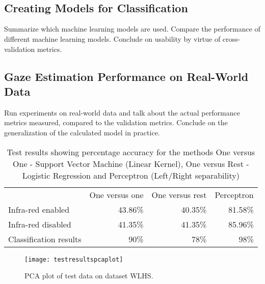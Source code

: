 \begin{minipage}{\linewidth}
{\begin{tabular}{ccccccc}
  \end{tabular}
  }
  \label{fig:wlhspcaimages}
  \end{minipage}\\\\



\subsection{Creating Models for Classification}
\label{sub:CreatingModelsforClassification}
Summarize which machine learning models are used.
Compare the performance of different machine learning models.
Conclude on usability by virtue of cross-validation metrics.
\subsection{Gaze Estimation Performance on Real-World Data}
\label{sub:GazeEstimationPerformanceonReal-WorldData}
Run experiments on real-world data and talk about the actual performance metrics measured, compared to the validation metrics.
Conclude on the generalization of the calculated model in practice.

\begin{table}[h!]
\centering
\begin{tabular}{l|rrr}
\hline
\noalign{\smallskip}
 & One versus one & One versus rest & Perceptron\\
\noalign{\smallskip}
\hline
\noalign{\smallskip}
Infra-red enabled & 43.86\% & 40.35\% & 81.58\% \\
Infra-red disabled & 41.35\% & 41.35\% & 85.96\% \\
Classification results & 90\% & 78\% & 98\% \\
\hline
\end{tabular}
\caption{Test results showing percentage accuracy for the methods One versus One - Support Vector Machine (Linear Kernel), One versus Rest - Logistic Regression and Perceptron (Left/Right separability)}\label{tab:test results}
\end{table}

\begin{figure}[h!]
\centering
\texttt{[image: testresultspcaplot]}
\caption{PCA plot of test data on dataset WLHS.}
\label{fig:testresultspcaplot}
\end{figure}